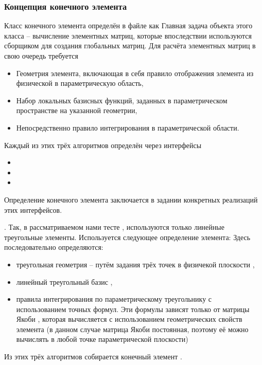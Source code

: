 \subsubsection{Концепция конечного элемента}
Класс конечного элемента  определён в файле
 как
Главная задача объекта этого класса -- вычисление элементных матриц,
которые впоследствии используются сборщиком
для создания глобальных матриц.
Для расчёта элементных матриц в свою очередь требуется
\begin{itemize}
\item Геометрия элемента, включающая в себя правило отображения элемента из физической в параметрическую область,
\item Набор локальных базисных функций, заданных в параметрическом пространстве на указанной геометрии,
\item Непосредственно правило интегрирования в параметрической области.
\end{itemize}
Каждый из этих трёх алгоритмов определён через интерфейсы
\begin{itemize}
\item {}
\item {}
\item {}
\end{itemize}
Определение конечного элемента заключается в задании конкретных реализаций этих интерфейсов.

\label{sec:linear_triangle_assembly}.
Так, в рассматриваемом нами тесте , используются только линейные треугольные элементы.
Используется следующее определение элемента:
Здесь последовательно определяются:
\begin{itemize}
\item
треугольная геометрия  -- путём задания трёх точек в физичекой плоскости ,
\item
линейный треугольный базис ,
\item
правила интегрирования  по параметрическому треугольнику
с использованием точных формул. Эти формулы зависят только от матрицы Якоби , которая
вычисляется с использованием геометрических свойств элемента
(в данном случае матрица Якоби постоянная, поэтому её можно вычислять в любой точке параметрической плоскости)
\end{itemize}
Из этих трёх алгоритмов собирается конечный элемент .

